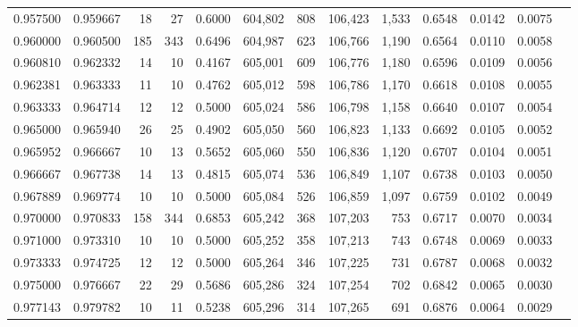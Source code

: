 \begin{tabular}{rrrrrrrrrrrrr}
0.957500 & 0.959667 &    18 &  27 &                                     0.6000 & 604,802 &     808 & 106,423 &   1,533 & 0.6548 & 0.0142 & 0.0075 \\
0.960000 & 0.960500 &   185 & 343 &                                     0.6496 & 604,987 &     623 & 106,766 &   1,190 & 0.6564 & 0.0110 & 0.0058 \\
0.960810 & 0.962332 &    14 &  10 &                                     0.4167 & 605,001 &     609 & 106,776 &   1,180 & 0.6596 & 0.0109 & 0.0056 \\
0.962381 & 0.963333 &    11 &  10 &                                     0.4762 & 605,012 &     598 & 106,786 &   1,170 & 0.6618 & 0.0108 & 0.0055 \\
0.963333 & 0.964714 &    12 &  12 &                                     0.5000 & 605,024 &     586 & 106,798 &   1,158 & 0.6640 & 0.0107 & 0.0054 \\
0.965000 & 0.965940 &    26 &  25 &                                     0.4902 & 605,050 &     560 & 106,823 &   1,133 & 0.6692 & 0.0105 & 0.0052 \\
0.965952 & 0.966667 &    10 &  13 &                                     0.5652 & 605,060 &     550 & 106,836 &   1,120 & 0.6707 & 0.0104 & 0.0051 \\
0.966667 & 0.967738 &    14 &  13 &                                     0.4815 & 605,074 &     536 & 106,849 &   1,107 & 0.6738 & 0.0103 & 0.0050 \\
0.967889 & 0.969774 &    10 &  10 &                                     0.5000 & 605,084 &     526 & 106,859 &   1,097 & 0.6759 & 0.0102 & 0.0049 \\
0.970000 & 0.970833 &   158 & 344 &                                     0.6853 & 605,242 &     368 & 107,203 &     753 & 0.6717 & 0.0070 & 0.0034 \\
0.971000 & 0.973310 &    10 &  10 &                                     0.5000 & 605,252 &     358 & 107,213 &     743 & 0.6748 & 0.0069 & 0.0033 \\
0.973333 & 0.974725 &    12 &  12 &                                     0.5000 & 605,264 &     346 & 107,225 &     731 & 0.6787 & 0.0068 & 0.0032 \\
0.975000 & 0.976667 &    22 &  29 &                                     0.5686 & 605,286 &     324 & 107,254 &     702 & 0.6842 & 0.0065 & 0.0030 \\
0.977143 & 0.979782 &    10 &  11 &                                     0.5238 & 605,296 &     314 & 107,265 &     691 & 0.6876 & 0.0064 & 0.0029 \\

\end{tabular}
